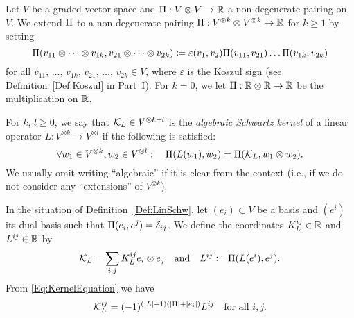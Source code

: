 \documentclass[\MainFolder/Text.tex]{subfiles}
\begin{document}
\begin{Definition}\label{Def:LinSchw}
Let $V$ be a graded vector space and $\Pi: V\otimes V \rightarrow \mathbb{R}$ a non-degenerate pairing on $V$. We extend $\Pi$ to a non-degenerate pairing $\Pi: V^{\otimes k}\otimes V^{\otimes k}\rightarrow \mathbb{R}$ for $k\ge 1$ by setting
\begin{equation*} 
\Pi(v_{11} \otimes \dotsb \otimes v_{1k}, v_{21}\otimes \dotsb \otimes v_{2k}) \coloneqq \varepsilon(v_1, v_2)\Pi(v_{11},v_{21}) \dots \Pi(v_{1k},v_{2k})
\end{equation*}
for all $v_{11}$, $\dotsc$, $v_{1k}$, $v_{21}$, $\dotsc$,  $v_{2k}\in V$, where $\varepsilon$ is the Koszul sign (see Definition~\ref{Def:Koszul} in Part~I). For $k=0$, we let $\Pi: \mathbb{R}\otimes \mathbb{R} \rightarrow \mathbb{R}$ be the multiplication on $\mathbb{R}$.

For $k$, $l \ge 0$, we say that $\mathcal{K}_L\in V^{\otimes k + l}$ is the \emph{algebraic Schwartz kernel} of a linear operator $L: V^{\otimes k} \rightarrow V^{\otimes l}$ if the following is satisfied:
\begin{equation} \label{Eq:KernelEquation}
\forall w_1 \in V^{\otimes k},  w_2 \in V^{\otimes l}:\quad \Pi(L(w_1),w_2) = \Pi(\mathcal{K}_L, w_1\otimes w_2).
\end{equation}
We usually omit writing ``algebraic'' if it is clear from the context (i.e., if we do not consider any ``extensions'' of $V^{\otimes k}$). 
\end{Definition}

In the situation of Definition~\ref{Def:LinSchw}, let $(e_i)\subset V$ be a basis and $(e^i)$ its dual basis such that $\Pi(e_i,e^j)=\delta_{ij}$. We define the coordinates $K_L^{ij} \in \mathbb{R}$ and $L^{ij}\in \mathbb{R}$ by 
$$ \mathcal{K}_L = \sum_{i,j} K_L^{ij} e_i \otimes e_j\quad\text{and}\quad L^{ij} \coloneqq \Pi(L (e^i),e^j).$$
From \eqref{Eq:KernelEquation} we have
\begin{equation} \label{Eq:KernelCoordinates}
\mathcal{K}_L^{ij} = (-1)^{(|L|+1)(|\Pi|+|e_i|)} L^{ij}\quad \text{for all }i,j.
\end{equation} 
\end{document}
